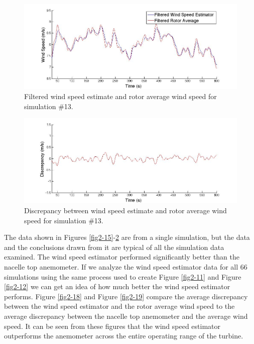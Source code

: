 \begin{figure}[ht]
	\centering
		\includegraphics[width = \linewidth]{Figures/ch2Figures/fig2-16.jpg}
		
	\caption{Filtered wind speed estimate and rotor average wind speed for simulation \#13.}
	\label{fig2-16}
\end{figure}



\begin{figure}[ht]
	\centering
		\includegraphics[width = \linewidth]{Figures/ch2Figures/fig2-17.jpg}
		
	\caption{Discrepancy between wind speed estimate and rotor average wind speed for simulation \#13.}
	\label{fig2-17}
\end{figure}

The data shown in Figures \ref{fig2-15}-\ref{fig2-17} are from a single simulation, but the data and the conclusions drawn from it are typical of all the simulation data examined. The wind speed estimator performed significantly better than the nacelle top anemometer. If we analyze the wind speed estimator data for all 66 simulations using the same process used to create Figure \ref{fig2-11} and Figure \ref{fig2-12} we can get an idea of how much better the wind speed estimator performs. Figure \ref{fig2-18} and Figure \ref{fig2-19} compare the average discrepancy between the wind speed estimator and the rotor average wind speed to the average discrepancy between the nacelle top anemometer and the average wind speed. It can be seen from these figures that the wind speed estimator outperforms the anemometer across the entire operating range of the turbine. 


